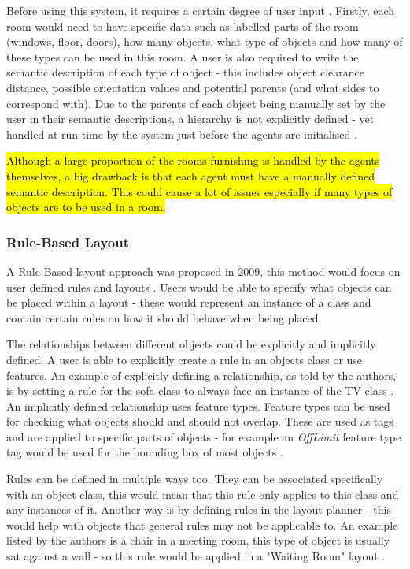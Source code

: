 Before using this system, it requires a certain degree of user input \cite{real-time-walkthroughs}. Firstly, each room would need to have specific data such as labelled parts of the room (windows, floor, doors), how many objects, what type of objects and how many of these types can be used in this room.
A user is also required to write the semantic description of each type of object - this includes object clearance distance, possible orientation values and potential parents (and what sides to correspond with).
Due to the parents of each object being manually set by the user in their semantic descriptions, a hierarchy is not explicitly defined - yet handled at run-time by the system just before the agents are initialised \cite{real-time-walkthroughs}.

\hl{Although a large proportion of the rooms furnishing is handled by the agents themselves, a big drawback is that each agent must have a manually defined semantic description. This could cause a lot of issues especially if many types of objects are to be used in a room.}

\subsubsection*{Rule-Based Layout}
A Rule-Based layout approach was proposed in 2009, this method would focus on user defined rules and layouts \cite{rule-based-layout}. Users would be able to specify what objects can be placed within a layout - these would represent an instance of a class and contain certain rules on how it should behave when being placed.

The relationships between different objects could be explicitly and implicitly defined. A user is able to explicitly create a rule in an objects class or use features. An example of explicitly defining a relationship, as told by the authors, is by setting a rule for the sofa class to always face an instance of the TV class \cite{rule-based-layout}.
An implicitly defined relationship uses feature types. Feature types can be used for checking what objects should and should not overlap. These are used as tags and are applied to specific parts of objects - for example an \textit{OffLimit} feature type tag would be used for the bounding box of most objects \cite{rule-based-layout}.

Rules can be defined in multiple ways too. They can be associated specifically with an object class, this would mean that this rule only applies to this class and any instances of it.
Another way is by defining rules in the layout planner - this would help with objects that general rules may not be applicable to. An example listed by the authors is a chair in a meeting room, this type of object is usually sat against a wall - so this rule would be applied in a "Waiting Room" layout \cite{rule-based-layout}.

